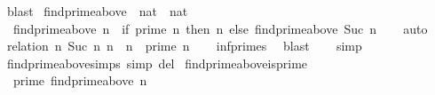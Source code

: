 \begin{isabellebody}
\ blast\isanewline
{}\isamarkupfalse%
%
\endisatagproof
{\isafoldproof}%
%
\isadelimproof
\isanewline
%
\endisadelimproof
\isanewline
{}\isamarkupfalse%
\ find{\isacharunderscore}{\kern0pt}prime{\isacharunderscore}{\kern0pt}above\ {\isacharcolon}{\kern0pt}{\isacharcolon}{\kern0pt}\ {\isachardoublequoteopen}nat\ {\isasymRightarrow}\ nat{\isachardoublequoteclose}\ \isanewline
\ \ {\isachardoublequoteopen}find{\isacharunderscore}{\kern0pt}prime{\isacharunderscore}{\kern0pt}above\ n\ {\isacharequal}{\kern0pt}\ {\isacharparenleft}{\kern0pt}if\ prime\ n\ then\ n\ else\ find{\isacharunderscore}{\kern0pt}prime{\isacharunderscore}{\kern0pt}above\ {\isacharparenleft}{\kern0pt}Suc\ n{\isacharparenright}{\kern0pt}{\isacharparenright}{\kern0pt}{\isachardoublequoteclose}\isanewline
%
\isadelimproof
\ \ %
\endisadelimproof
%
\isatagproof
{}\isamarkupfalse%
\ auto%
\endisatagproof
{\isafoldproof}%
%
\isadelimproof
\isanewline
%
\endisadelimproof
{}\isamarkupfalse%
\isanewline
%
\isadelimproof
\ \ %
\endisadelimproof
%
\isatagproof
{}\isamarkupfalse%
\ {\isacharparenleft}{\kern0pt}relation\ {\isachardoublequoteopen}{\isacharparenleft}{\kern0pt}{\isasymlambda}n{\isachardot}{\kern0pt}\ {\isacharparenleft}{\kern0pt}Suc\ n{\isacharcomma}{\kern0pt}\ n{\isacharparenright}{\kern0pt}{\isacharparenright}{\kern0pt}\ {\isacharbackquote}{\kern0pt}\ {\isacharbraceleft}{\kern0pt}n{\isachardot}{\kern0pt}\ {\isasymnot}\ {\isacharparenleft}{\kern0pt}prime\ n{\isacharparenright}{\kern0pt}{\isacharbraceright}{\kern0pt}{\isachardoublequoteclose}{\isacharparenright}{\kern0pt}\isanewline
\ \ \isamarkupfalse%
\ inf{\isacharunderscore}{\kern0pt}primes\ \isamarkupfalse%
\ blast\isanewline
\ \ \isamarkupfalse%
\ simp%
\endisatagproof
{\isafoldproof}%
%
\isadelimproof
\isanewline
%
\endisadelimproof
\isanewline
{}\isamarkupfalse%
\ find{\isacharunderscore}{\kern0pt}prime{\isacharunderscore}{\kern0pt}above{\isachardot}{\kern0pt}simps\ {\isacharbrackleft}{\kern0pt}simp\ del{\isacharbrackright}{\kern0pt}\isanewline
\isanewline
{}\isamarkupfalse%
\ find{\isacharunderscore}{\kern0pt}prime{\isacharunderscore}{\kern0pt}above{\isacharunderscore}{\kern0pt}is{\isacharunderscore}{\kern0pt}prime{\isacharcolon}{\kern0pt}\isanewline
\ \ {\isachardoublequoteopen}prime\ {\isacharparenleft}{\kern0pt}find{\isacharunderscore}{\kern0pt}prime{\isacharunderscore}{\kern0pt}above\ n{\isacharparenright}{\kern0pt}{\isachardoublequoteclose}\isanewline

\end{isabellebody}
